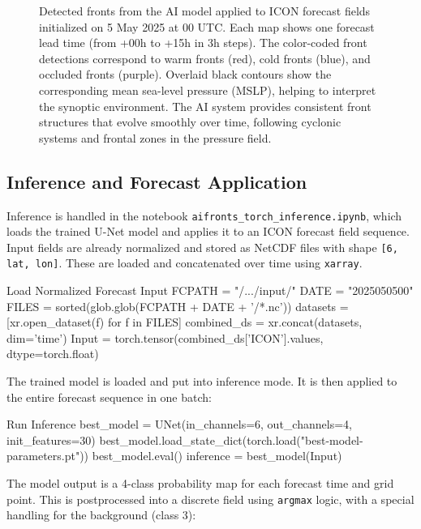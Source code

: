 \begin{figure}[ht]
\begin{tabular}{ccc}
  \end{tabular}
  \caption{Detected fronts from the AI model applied to ICON forecast fields initialized on 5 May 2025 at 00 UTC. Each map shows one forecast lead time (from +00h to +15h in 3h steps). The color-coded front detections correspond to warm fronts (red), cold fronts (blue), and occluded fronts (purple). Overlaid black contours show the corresponding mean sea-level pressure (MSLP), helping to interpret the synoptic environment. The AI system provides consistent front structures that evolve smoothly over time, following cyclonic systems and frontal zones in the pressure field.}
  \label{fig:forecast_fronts}
\end{figure}


\subsection{Inference and Forecast Application}

Inference is handled in the notebook \texttt{aifronts\_torch\_inference.ipynb}, which loads the trained U-Net model and applies it to an ICON forecast field sequence. Input fields are already normalized and stored as NetCDF files with shape \texttt{[6, lat, lon]}. These are loaded and concatenated over time using \texttt{xarray}.

\begin{codeonly}{Load Normalized Forecast Input}
FCPATH      = "/.../input/"
DATE        = "2025050500"
FILES       = sorted(glob.glob(FCPATH + DATE + '/*.nc'))
datasets    = [xr.open_dataset(f) for f in FILES]
combined_ds = xr.concat(datasets, dim='time')
Input       = torch.tensor(combined_ds['ICON'].values, dtype=torch.float)
\end{codeonly}

The trained model is loaded and put into inference mode. It is then applied to the entire forecast sequence in one batch:

\begin{codeonly}{Run Inference}
best_model = UNet(in_channels=6, out_channels=4, init_features=30)
best_model.load_state_dict(torch.load("best-model-parameters.pt"))
best_model.eval()
inference  = best_model(Input)
\end{codeonly}

The model output is a 4-class probability map for each forecast time and grid point. This is postprocessed into a discrete field using \texttt{argmax} logic, with a special handling for the background (class 3):

